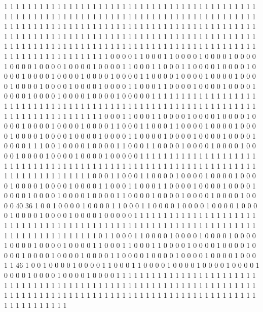 1 1 1 1 1 1 1 1 1 1 1 1 1 1 1 1 1 1 1 1
1 1 1 1 1 1 1 1 1 1 1 1 1 1 1 1 1 1 1 1
1 1 1 1 1 1 1 1 1 1 1 1 1 1 1 1 1 1 1 1
1 1 1 1 1 1 1 1 1 1 1 1 1 1 1 1 1 1 1 1
1 1 1 1 1 1 1 1 1 1 1 1 1 1 1 1 1 1 1 1
1 1 1 1 1 1 1 1 1 1 1 1 1 1 1 1 1 1 1 1
1 1 1 1 1 1 1 1 1 1 1 1 1 1 1 1 1 1 1 1
1 1 1 1 1 1 1 1 1 1 1 1 1 1 1 1 1 1 1 1
1 1 1 1 1 1 1 1 1 1 1 1 1 1 1 1 1 1 1 1
1 1 1 1 1 1 1 1 1 1 1 1 1 1 1 1 1 1 1 1
1 1 1 1 1 1 1 1 1 1 1 1 1 1 1 1 1 1 1 1
1 1 1 1 1 1 1 1 1 1 1 1 1 0 0 0 0 1 1 0
0 0 1 1 0 0 0 0 1 0 0 0 0 1 0 0 0 0 1 0
0 0 0 1 0 0 0 0 1 0 0 0 0 1 0 0 0 0 1 1
0 0 0 1 1 0 0 0 1 1 0 0 0 0 1 0 0 0 0 1
0 0 0 0 1 0 0 0 0 1 0 0 0 0 1 0 0 0 0 1
0 0 0 0 1 1 0 0 0 0 1 0 0 0 0 1 0 0 0 0
1 0 0 0 0 1 0 0 0 0 1 0 0 0 0 1 0 0 0 0
1 0 0 0 0 1 1 0 0 0 1 1 0 0 0 0 1 0 0 0
0 1 0 0 0 0 1 0 0 0 0 1 0 0 0 0 1 0 0 0
0 1 0 0 0 0 1 0 0 0 0 0 1 1 1 1 1 1 1 1
1 1 1 1 1 1 1 1 1 1 1 1 1 1 1 1 1 1 1 1
1 1 1 1 1 1 1 1 1 1 1 1 1 1 1 1 1 1 1 1
1 1 1 1 1 1 1 1 1 1 1 1 1 1 1 1 1 1 1 1
1 1 1 1 1 1 1 1 1 1 0 0 0 1 1 0 0 0 1 1
0 0 0 0 1 0 0 0 0 1 0 0 0 0 1 0 0 0 0 1
0 0 0 0 1 0 0 0 0 1 0 0 0 0 1 1 0 0 0 1
1 0 0 0 1 1 0 0 0 0 1 0 0 0 0 1 0 0 0 0
1 0 0 0 0 1 0 0 0 0 1 0 0 0 0 1 0 0 0 0
1 1 0 0 0 0 1 0 0 0 0 1 0 0 0 0 1 0 0 0
0 1 0 0 0 0 1 1 1 0 0 1 0 0 0 0 1 0 0 0
0 1 1 0 0 0 1 1 0 0 0 0 1 0 0 0 0 1 0 0
0 0 1 0 0 0 0 1 0 0 0 0 1 0 0 0 0 1 0 0
0 0 1 0 0 0 0 0 1 1 1 1 1 1 1 1 1 1 1 1
1 1 1 1 1 1 1 1 1 1 1 1 1 1 1 1 1 1 1 1
1 1 1 1 1 1 1 1 1 1 1 1 1 1 1 1 1 1 1 1
1 1 1 1 1 1 1 1 1 1 1 1 1 1 1 1 1 1 1 1
1 1 1 1 1 1 0 0 0 1 1 0 0 0 1 1 0 0 0 0
1 0 0 0 0 1 0 0 0 0 1 0 0 0 0 1 0 0 0 0
1 0 0 0 0 1 0 0 0 0 1 1 0 0 0 1 1 0 0 0
1 1 0 0 0 0 1 0 0 0 0 1 0 0 0 0 1 0 0 0
0 1 0 0 0 0 1 0 0 0 0 1 0 0 0 0 1 1 0 0
0 0 1 0 0 0 0 1 0 0 0 0 1 0 0 0 0 1 0 0
0 0 40 36 1 0 0 1 0 0 0 0 1 0 0 0 0 1 1 0
0 0 1 1 0 0 0 0 1 0 0 0 0 1 0 0 0 0 1 0
0 0 0 1 0 0 0 0 1 0 0 0 0 1 0 0 0 0 1 0
0 0 0 0 1 1 1 1 1 1 1 1 1 1 1 1 1 1 1 1
1 1 1 1 1 1 1 1 1 1 1 1 1 1 1 1 1 1 1 1
1 1 1 1 1 1 1 1 1 1 1 1 1 1 1 1 1 1 1 1
1 1 1 1 1 1 1 1 1 1 1 1 1 1 1 1 1 1 1 1
1 1 1 1 0 1 1 0 0 0 1 1 0 0 0 0 1 0 0 0
0 1 0 0 0 0 1 0 0 0 0 1 0 0 0 0 1 0 0 0
0 1 0 0 0 0 1 1 0 0 0 1 1 0 0 0 1 1 0 0
0 0 1 0 0 0 0 1 0 0 0 0 1 0 0 0 0 1 0 0
0 0 1 0 0 0 0 1 0 0 0 0 1 1 0 0 0 0 1 0
0 0 0 1 0 0 0 0 1 0 0 0 0 1 0 0 0 1 1 46
1 0 0 1 0 0 0 0 1 0 0 0 0 1 1 0 0 0 1 1
0 0 0 0 1 0 0 0 0 1 0 0 0 0 1 0 0 0 0 1
0 0 0 0 1 0 0 0 0 1 0 0 0 0 1 0 0 0 0 1
1 1 1 1 1 1 1 1 1 1 1 1 1 1 1 1 1 1 1 1
1 1 1 1 1 1 1 1 1 1 1 1 1 1 1 1 1 1 1 1
1 1 1 1 1 1 1 1 1 1 1 1 1 1 1 1 1 1 1 1
1 1 1 1 1 1 1 1 1 1 1 1 1 1 1 1 1 1 1 1
1 1 1 1 1 1 1 1 1 1 1 1 1 1 1 1 1 1 1 1
1 1 1 1 1 1 1 1 1 1 1 1 1 1 1 1 1 1 1 1
